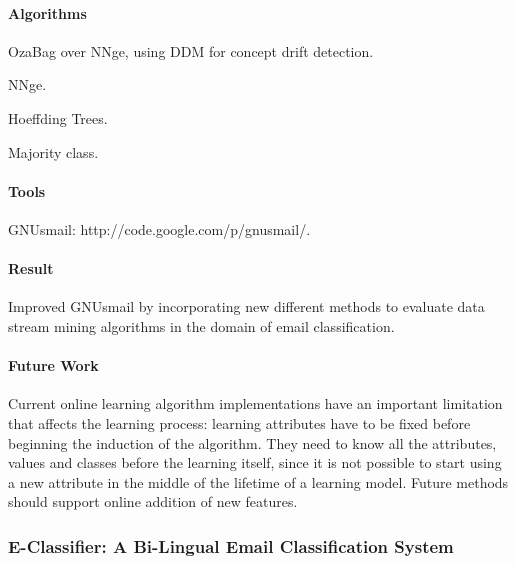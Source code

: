 \documentclass[12pt]{article}
\newenvironment{my_itemize}
{\begin{itemize}
  \setlength{\itemsep}{0cm}
  \setlength{\parskip}{0cm}}
{\end{itemize}}
\begin{document}
\paragraph{Algorithms}
\begin{my_itemize}
    \item OzaBag over NNge, using DDM for concept drift detection.
    \item NNge.
    \item Hoeffding Trees.
    \item Majority class.
\end{my_itemize}

\paragraph{Tools}
\begin{my_itemize}
    \item GNUsmail: http://code.google.com/p/gnusmail/.
\end{my_itemize}

\paragraph{Result}
\begin{my_itemize}
  \item Improved GNUsmail by incorporating new different methods to evaluate 
	data stream mining algorithms in the domain of email classification.
\end{my_itemize}

\paragraph{Future Work}
\begin{my_itemize}
  \item Current online learning algorithm implementations have an important 
	limitation that affects the learning process: learning attributes have 
	to be fixed before beginning the induction of the algorithm. They need 
	to know all the attributes, values and classes before the learning itself, 
	since it is not possible to start using a new attribute in the middle of the 
	lifetime of a learning model. Future methods should support online addition of
	new features.
\end{my_itemize}

\subsubsection{E-Classifier: A Bi-Lingual Email Classification System \cite{NOUF08}}
\end{document}
